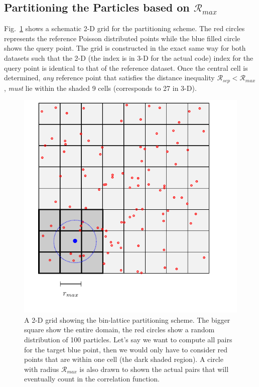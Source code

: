 \documentclass[preprint, 12pt, authoryear]{elsarticle}
\newcommand{\rmax}{\ensuremath{{{\mathcal{R}}_{max}}}\xspace}
\newcommand{\rsep}{\ensuremath{{{\mathcal{R}}_{sep}}}\xspace}
\begin{document}
\subsection{Partitioning the Particles based on \rmax}
Fig.~\ref{fig:grid} shows a schematic 2-D grid for the partitioning scheme. The
red circles represents the reference Poisson distributed points while the blue filled circle
shows the query point. The grid is constructed in the exact same way for both
datasets such that the 2-D (the index is in 3-D for the actual code)  index for the query point is identical to that of
the reference dataset. Once the central cell is determined, {\em any} reference
point that satisfies the distance inequality $\rsep < \rmax$, {\em must} lie
within the shaded 9 cells (corresponds to 27 in 3-D). 
\begin{figure}[htbp]
\centering
\includegraphics[clip=true]{tikz_grid}
\caption{A 2-D grid showing the bin-lattice partitioning scheme. The bigger square show the entire 
domain, the red circles show a random distribution of 100 particles. Let's say we want to compute all pairs 
for the target blue point, then we would only have to consider red points that are within one cell (the dark shaded region). 
A circle with radius \rmax is also drawn to shown the actual pairs that will eventually count in the correlation function.} 
\label{fig:grid}
\end{figure}
\end{document}
